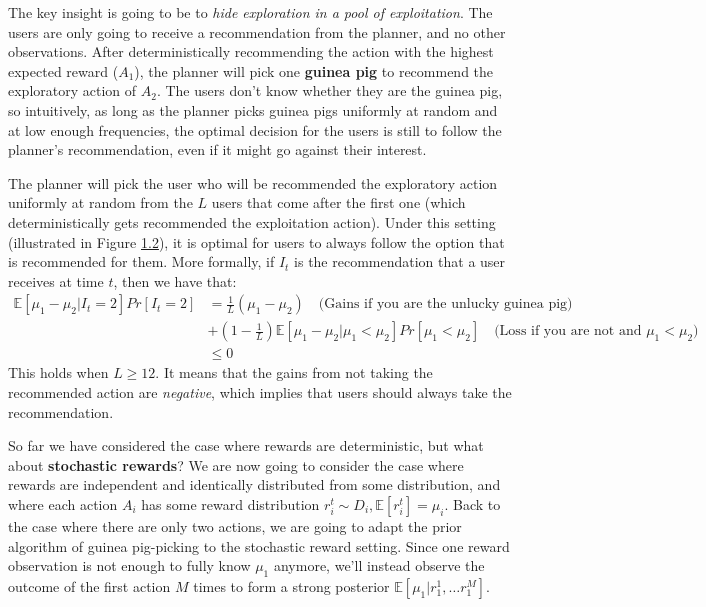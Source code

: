 \documentclass[
  letterpaper,
  numbers=noenddot,
  DIV=11,
  oneside]{scrreprt}
\theoremstyle{remark}
\begin{document}
The key insight is going to be to \emph{hide exploration in a pool of
exploitation}. The users are only going to receive a recommendation from
the planner, and no other observations. After deterministically
recommending the action with the highest expected reward (\(A_1\)), the
planner will pick one \textbf{guinea pig} to recommend the exploratory
action of \(A_2\). The users don't know whether they are the guinea pig,
so intuitively, as long as the planner picks guinea pigs uniformly at
random and at low enough frequencies, the optimal decision for the users
is still to follow the planner's recommendation, even if it might go
against their interest.

The planner will pick the user who will be recommended the exploratory
action uniformly at random from the \(L\) users that come after the
first one (which deterministically gets recommended the exploitation
action). Under this setting (illustrated in Figure
\hyperref[fig-deterministic-guinea-pig]{1.2}), it is optimal for users
to always follow the option that is recommended for them. More formally,
if \(I_t\) is the recommendation that a user receives at time \(t\),
then we have that: \[\begin{split}
    \mathbb{E}[\mu_1 - \mu_2 | I_t = 2] Pr[I_t = 2] &= \frac{1}{L} (\mu_1 - \mu_2) \quad \text{(Gains if you are the unlucky guinea pig)}\\
    &+ (1 - \frac{1}{L}) \mathbb{E}[\mu_1 - \mu_2 | \mu_1 < \mu_2] Pr[\mu_1 < \mu_2] \quad \text{(Loss if you are not and $\mu_1 < \mu_2$)}\\
    &\leq 0
\end{split}\] This holds when \(L \geq 12\). It means that the gains
from not taking the recommended action are \emph{negative}, which
implies that users should always take the recommendation.

So far we have considered the case where rewards are deterministic, but
what about \textbf{stochastic rewards}? We are now going to consider the
case where rewards are independent and identically distributed from some
distribution, and where each action \(A_i\) has some reward distribution
\(r_i^t \sim D_i, \mathbb{E}[r_i^t] = \mu_i\). Back to the case where
there are only two actions, we are going to adapt the prior algorithm of
guinea pig-picking to the stochastic reward setting. Since one reward
observation is not enough to fully know \(\mu_1\) anymore, we'll instead
observe the outcome of the first action \(M\) times to form a strong
posterior \(\mathbb{E}[\mu_1 | r_1^1, \ldots r_1^M]\).
\end{document}
